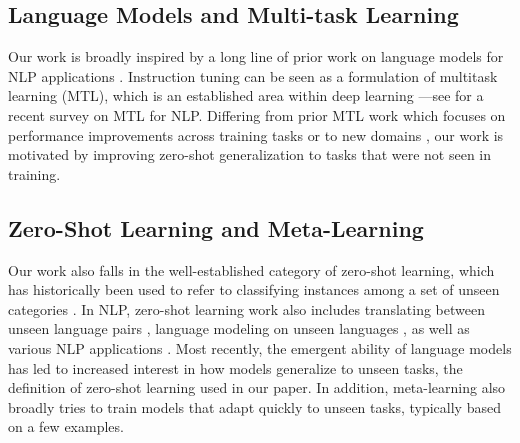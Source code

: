 \documentclass{article} %
\begin{document}
\subsection{Language Models and Multi-task Learning}
Our work is broadly inspired by a long line of prior work on language models for NLP applications \citep[][\textit{inter alia}]{dai2015semi,peters-etal-2018-deep,howard-ruder-2018-universal,radford2018improving,radford2019language}. 
Instruction tuning can be seen as a formulation of multitask learning (MTL), which is an established area within deep learning \citep[][\textit{inter alia}]{collobert2011natural,luong2015multi,ruder2017overview,velay2018seq2seq,clark2019bam,liu2019multi}---see \citet{Worsham2020MultitaskLF} for a recent survey on MTL for NLP. 
Differing from prior MTL work which focuses on performance improvements across training tasks \citep{raffel2019exploring,aghajanyan2021muppet} or to new domains \citep{axelrod-etal-2011-domain}, our work is motivated by improving zero-shot generalization to tasks that were not seen in training.

\subsection{Zero-Shot Learning and Meta-Learning}
Our work also falls in the well-established category of zero-shot learning, which has historically been used to refer to classifying instances among a set of unseen categories \citep[][\textit{inter alia}]{lampert2009learning,romera2015embarrassingly,srivastava-etal-2018-zero,yin-etal-2019-benchmarking}.
In NLP, zero-shot learning work also includes translating between unseen language pairs \citep{johnson-etal-2017-googles,pham-etal-2019-improving}, language modeling on unseen languages \citep{lauscher-etal-2020-zero}, as well as various NLP applications \citep{liu-etal-2019-reconstructing,corazza-etal-2020-hybrid,wang2021zl3}.
Most recently, the emergent ability of language models \citep{brown2020language} has led to increased interest in how models generalize to unseen tasks, the definition of zero-shot learning used in our paper.
In addition, meta-learning \citep[][\textit{inter alia}]{finn2017model,vanschoren2018meta} also broadly tries to train models that adapt quickly to unseen tasks, typically based on a few examples.
\end{document}
